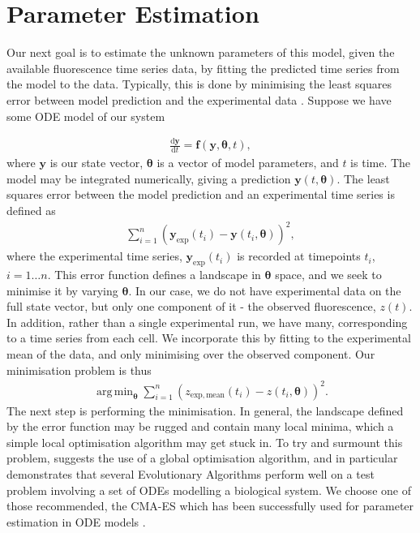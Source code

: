 \documentclass[10pt,journal]{./IEEE_latex_class/IEEEtran}
\DeclareMathOperator*{\argmin}{arg\,min}
\begin{document}



\section{Parameter Estimation}
\label{Parameter Estimation}

Our next goal is to estimate the unknown parameters of this model, given the available fluorescence time series data, by fitting the predicted time series from the model to the data. Typically, this is done by minimising the least squares error between model prediction and the experimental data \cite{Brewer2008,Algorithms2003, Hu2015}. Suppose we have some ODE model of our system

\begin{align}
\frac{\mathrm{d}\mathbf{y}}{\mathrm{d}t} = \mathbf{f}(\mathbf{y},\boldsymbol{\theta},t),
\end{align}
where $\mathbf{y}$ is our state vector, $\boldsymbol{\theta}$ is a vector of model parameters, and $t$ is time. The model may be integrated numerically, giving a prediction $\mathbf{y}(t,\boldsymbol{\theta})$. The least squares error between the model prediction and an experimental time series is defined as
\begin{align}
 \sum_{i =1}^{n} (\mathbf{y}_{\mathrm{exp}}(t_{i}) - \mathbf{y}(t_{i},\boldsymbol{\theta}))^2,
\end{align}
where the experimental time series, $\mathbf{y}_{\mathrm{exp}}(t_{i})$ is recorded at timepoints $t_{i}$, $i = 1 \hdots n$. This error function defines a landscape in $\boldsymbol{\theta}$ space, and we seek to minimise it by varying $\boldsymbol{\theta}$. In our case, we do not have experimental data on the full state vector, but only one component of it - the observed fluorescence, $z(t)$. In addition, rather than a single experimental run, we have many, corresponding to a time series from each cell. We incorporate this by fitting to the experimental mean of the data, and only minimising over the observed component. Our minimisation problem is thus
\begin{align}
\argmin_{\boldsymbol{\theta}} \sum_{i =1}^{n} (z_{\mathrm{exp, mean}}(t_{i}) - z(t_{i},\boldsymbol{\theta}))^2.
\label{eq:min}
\end{align}
The next step is performing the minimisation. In general, the landscape defined by the error function may be rugged and contain many local minima, which a simple local optimisation algorithm may get stuck in. To try and surmount this problem, \cite{Algorithms2003} suggests the use of a global optimisation algorithm, and in particular demonstrates that several Evolutionary Algorithms perform well on a test problem involving a set of ODEs modelling a biological system. We choose one of those recommended, the CMA-ES \cite{Hansen2006,Hansen2011} which has been successfully used for parameter estimation in ODE models \cite{Ballesta2011,Dulong2015} . 
\end{document}
